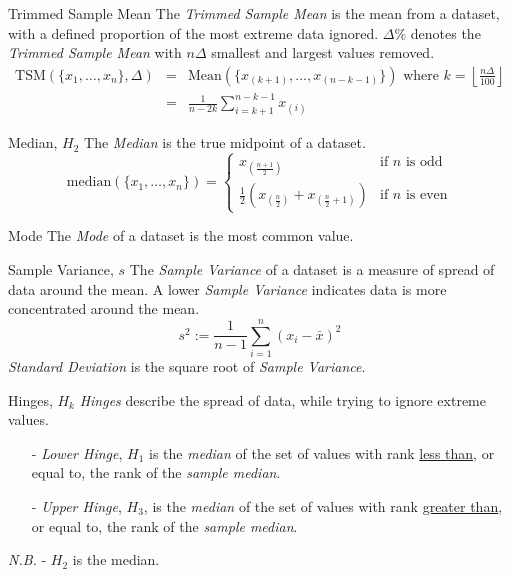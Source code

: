\documentclass[11pt,a4paper]{article}
\begin{document}
\begin{definition}{Trimmed Sample Mean}
The \textit{Trimmed Sample Mean} is the mean from a dataset, with a defined proportion of the most extreme data ignored. $\Delta\%$ denotes the \textit{Trimmed Sample Mean} with $n\Delta$ smallest and largest values removed.
\[\begin{array}{rcl}
  \text{TSM}(\{x_1,\dots,x_n\},\Delta)&=&\text{Mean}(\{x_{(k+1)},\dots,x_{(n-k-1)}\}) \text{ where } k=\left\lfloor\frac{n\Delta}{100}\right\rfloor\\
  &=&\frac1{n-2k}\sum\limits_{i=k+1}^{n-k-1}x_{(i)}
\end{array}\]
\end{definition}

\begin{definition}{Median, $H_2$}
The \textit{Median} is the true midpoint of a dataset.
\[
\text{median}(\{x_1,\dots,x_n\})=\begin{cases}
  x_{\left(\frac{n+1}2\right)}&\text{if }n\text{ is odd}\\
  \frac12\left(x_{\left(\frac{n}2\right)}+x_{\left(\frac{n}2+1\right)}\right)&\text{if }n\text{ is even}
\end{cases}
\]
\end{definition}

\begin{definition}{Mode}
The \textit{Mode} of a dataset is the most common value.
\end{definition}

\begin{definition}{Sample Variance, $s$}
The \textit{Sample Variance} of a dataset is a measure of spread of data around the mean. A lower \textit{Sample Variance} indicates data is more concentrated around the mean.
\[
s^2:=\frac1{n-1}\sum_{i=1}^n(x_i-\bar{x})^2
\]
\textit{Standard Deviation} is the square root of \textit{Sample Variance}.
\end{definition}

\begin{definition}{Hinges, $H_k$}
\textit{Hinges} describe the spread of data, while trying to ignore extreme values.
\begin{itemize}
  \item[-] \textit{Lower Hinge}, $H_1$ is the \textit{median} of the set of values with rank \underline{less than}, or equal to, the rank of the \textit{sample median}.
  \item[-] \textit{Upper Hinge}, $H_3$, is the \textit{median} of the set of values with rank \underline{greater than}, or equal to, the rank of the \textit{sample median}.
\end{itemize}
\textit{N.B.} - $H_2$ is the median.
\end{definition}
\end{document}
